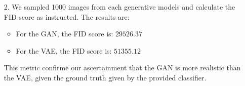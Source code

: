 \begin{itemize}
\begin{enumerate}
        \item[2.] We sampled 1000 images from each generative models and calculate the FID-score as instructed. The results are: 
        \begin{itemize}
        	\item For the GAN, the FID score is: $29 526.37$
        	\item For the VAE, the FID score is: $51 355.12$
        \end{itemize}
        This metric confirme our ascertainment that the GAN is more realistic than the VAE, given the ground truth given by the provided classifier.
        
    \end{enumerate}
\end{itemize}

